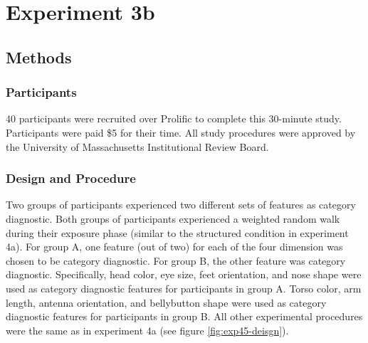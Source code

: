\section{Experiment 3b}
\subsection{Methods}
\subsubsection*{Participants}
40 participants were recruited over Prolific to complete this 30-minute study. Participants were paid \$5 for their time. All study procedures were approved by the University of Massachusetts Institutional Review Board. 

\subsubsection*{Design and Procedure}
Two groups of participants experienced two different sets of features as category diagnostic. Both groups of participants experienced a weighted random walk during their exposure phase (similar to the structured condition in experiment 4a). For group A, one feature (out of two) for each of the four dimension was chosen to be category diagnostic. For group B, the other feature was category diagnostic. Specifically, head color, eye size, feet orientation, and nose shape were used as category diagnostic features for participants in group A. Torso color, arm length, antenna orientation, and bellybutton shape were used as category diagnostic features for participants in group B. All other experimental procedures were the same as in experiment 4a (see figure \ref{fig:exp45-deisgn}). 

